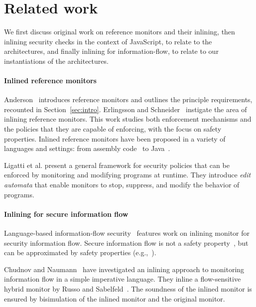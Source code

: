 \documentclass{llncs}
\begin{document}
\section{Related work}
\label{sec:related}
We first discuss original work on reference monitors and their
inlining, then
inlining security checks in the context of
JavaScript, to relate to the architectures, 
and finally inlining for information-flow, to relate to our instantiations
of the architectures.

\paragraph{Inlined reference monitors}
Anderson~\cite{Anderson:72} introduces reference monitors and
outlines the principle requirements, recounted in Section~\ref{sec:intro}.
%
Erlingsson and Schneider~\cite{DBLP:conf/nspw/ErlingssonS99,Erlingsson:PhD04} instigate
the area of inlining reference monitors. 
This work studies both enforcement mechanisms and the policies
that they are capable of enforcing, with the focus on safety properties.
Inlined reference monitors
have been proposed in a variety of languages and settings: from
assembly code~\cite{DBLP:conf/nspw/ErlingssonS99} to Java~\cite{DBLP:conf/ecoop/DamJLP09,DBLP:journals/jcs/DamJLP10,DBLP:conf/ccs/DamGL12}.

Ligatti et al. \cite{Ligatti05editautomata:} present a 
general framework for security policies that can
be enforced by monitoring and modifying programs at runtime. 
They introduce \emph{edit automata} that enable
monitors to stop, suppress, and modify the behavior of programs. 



\paragraph{Inlining for secure information flow}
Language-based information-flow security~\cite{Sabelfeld:Myers:JSAC}
features work on inlining monitor for security information flow.
Secure information flow is not
a safety property~\cite{McLean:SSP94}, but can be approximated by
safety properties
(e.g.,~\cite{Boudol:FAST08,Sabelfeld:Russo:PSI09,Austin:Flanagan:PLAS09}).

Chudnov and
Naumann~\cite{Chudnov:Naumann:CSF10} have investigated an inlining
approach to monitoring information flow in a simple imperative language. They inline a flow-sensitive
hybrid monitor by Russo and
Sabelfeld~\cite{Russo:Sabelfeld:CSF10}. The soundness of the inlined
monitor is ensured by bisimulation of the inlined monitor and the
original monitor.
\end{document}
